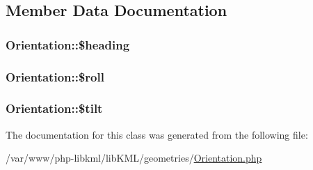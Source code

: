 \subsection{Member Data Documentation}
\hypertarget{classOrientation_ac90091d58ab5df8befd33c099e0cb6c8}{
\subsubsection[{\$heading}]{\setlength{\rightskip}{0pt plus 5cm}Orientation::\$heading}}
\label{d3/d38/classOrientation_ac90091d58ab5df8befd33c099e0cb6c8}
\hypertarget{classOrientation_a76d46ae5280f3ec27adbc825000db303}{
\subsubsection[{\$roll}]{\setlength{\rightskip}{0pt plus 5cm}Orientation::\$roll}}
\label{d3/d38/classOrientation_a76d46ae5280f3ec27adbc825000db303}
\hypertarget{classOrientation_ad39c193a6ab368858ad5c7e28d339488}{
\subsubsection[{\$tilt}]{\setlength{\rightskip}{0pt plus 5cm}Orientation::\$tilt}}
\label{d3/d38/classOrientation_ad39c193a6ab368858ad5c7e28d339488}


The documentation for this class was generated from the following file:\begin{DoxyCompactItemize}
\item 
/var/www/php-\/libkml/libKML/geometries/\hyperlink{Orientation_8php}{Orientation.php}\end{DoxyCompactItemize}
